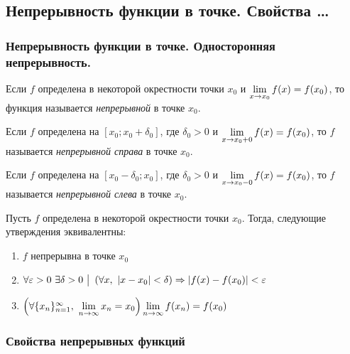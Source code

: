 \subsection{Непрерывность функции в точке. Свойства \dots} %

\subsubsection{Непрерывность функции в точке. Односторонняя непрерывность.}

\begin{definition}
	Если $f$ определена в некоторой окрестности точки $x_0$ и $\lim\limits_{x \to x_0} f(x) = f(x_0)$, то функция называется \textit{непрерывной} в точке $x_0$.
\end{definition}

\begin{definition}
	Если $f$ определена на $[x_0; x_0 + \delta_0]$, где $\delta_0 > 0$ и $\lim\limits_{x \to x_0 + 0} f(x) = f(x_0)$, то $f$ называется \textit{непрерывной справа} в точке $x_0$.
\end{definition}

\begin{definition}
	Если $f$ определена на $[x_0 - \delta_0; x_0]$, где $\delta_0 > 0$ и $\lim\limits_{x \to x_0 - 0} f(x) = f(x_0)$, то $f$ называется \textit{непрерывной слева} в точке $x_0$.
\end{definition}

\begin{theorem}
	Пусть $f$ определена в некоторой окрестности точки $x_0$. Тогда, следующие утверждения эквивалентны:
	\begin{enumerate}
		\item $f$ непрерывна в точке $x_0$
		\item $\forall \varepsilon > 0\ \exists \delta > 0 \ \big|\  \left(\forall x,\ |x - x_0| < \delta\right) \Rightarrow |f(x) - f(x_0)| < \varepsilon$
		\item $\left(\forall \{x_n\}_{n = 1}^\infty,\ \liml_{n \to \infty} x_n = x_0\right) \liml_{n \to \infty} f(x_n) = f(x_0)$
	\end{enumerate}
\end{theorem}

\subsubsection{Свойства непрерывных функций}

